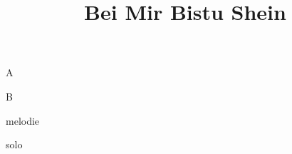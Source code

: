 \documentclass[timestamp]{jazzgrid}
\title{Bei Mir Bistu Shein}
\begin{document}
\maketitle

\begin{musicsection}{A}
\barline
	{}
	{\barfour{}{}{}{}{}}
	{}
	{\barfour{}{}{}{}{}}
\barline
	{}
	{\barfour{}{}{}{}{}}
	{}
	{}
	{}
	{}
\end{musicsection}

\begin{musicsection}{B}
\barline
	{}
	{\barfour{}{}{}{}{}}
	{}
	{\barfour{}{}{}{}{}}
\barline
	{}
	{}
	{}
	{}
\end{musicsection}

\footnotesize
\begin{description}[noitemsep,align=right,labelwidth=\widthof{\bfseries{AABA}}]
	\item [AABA] melodie
	\item [AABA] solo
\end{description}
\end{document}

